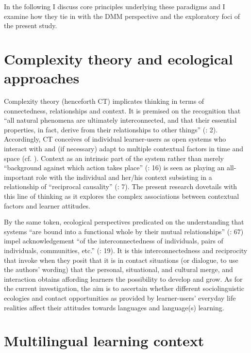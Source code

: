 \documentclass[output=paper]{../langscibook}
\begin{document}
In the following I discuss core principles underlying these paradigms and I examine how they tie in with the DMM perspective and the exploratory foci of the present study.

\section{Complexity theory and ecological approaches}

Complexity theory (henceforth CT) implicates thinking in terms of connectedness, relationships and context. It is premised on the recognition that “all natural phenomena are ultimately interconnected, and that their essential properties, in fact, derive from their relationships to other things” (\citealt{CapraLuisi2018}: 2). Accordingly, CT conceives of individual learner-users as open systems who interact with and (if necessary) adapt to multiple contextual factors in time and space (cf. \citealt{HerdinaJessner2002}). Context as an intrinsic part of the system rather than merely “background against which action takes place” (\citealt{Larsen-FreemanCameron2008}: 16) is seen as playing an all-important role with the individual and her/his context subsisting in a relationship of “reciprocal causality” (\citealt{Larsen-FreemanCameron2008}: 7). The present research dovetails with this line of thinking as it explores the complex associations between contextual factors and learner attitudes.

By the same token, ecological perspectives predicated on the understanding that systems “are bound into a functional whole by their mutual relationships” (\citealt{CapraLuisi2018}: 67) impel acknowledgement “of the interconnectedness of individuals, pairs of individuals, communities, etc.” (\citealt{Larsen-FreemanCameron2008}: 19). It is this interconnectedness and reciprocity that \citet[19]{KramschSteffensen2008} invoke when they posit that it is in contact situations (or dialogue, to use the authors’ wording) that the personal, situational, and cultural merge, and interaction obtains affording learners the possibility to develop and grow. As for the current investigation, the aim is to ascertain whether different sociolinguistic ecologies and contact opportunities as provided by learner-users’ everyday life realities affect their attitudes towards languages and language(s) learning.

\section{Multilingual learning context}
\end{document}

